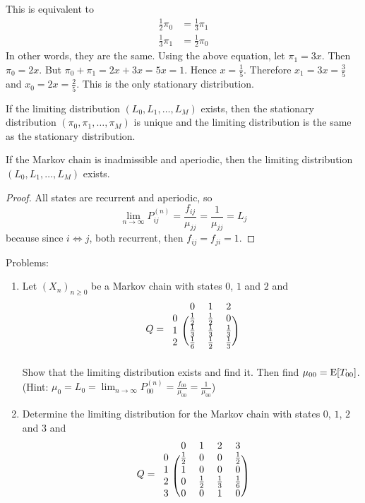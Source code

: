 \documentclass[12pt]{article}
\begin{document}
 This is equivalent to $$ \begin{aligned} \frac{1}{2}\pi_0 &= \frac{1}{3}\pi_1 \\ \frac{1}{3}\pi_1 &= \frac{1}{2}\pi_0 \end{aligned} $$ 
 In other words, they are the same. Using the above equation,  let $\pi_1 = 3x$. Then $\pi_0 = 2x$. But $\pi_0 + \pi_1 = 2x + 3x = 5x = 1$. Hence $x = \frac{1}{5}$. Therefore $x_1 = 3x = \frac{3}{5}$ and $x_0 = 2x = \frac{2}{5}$. This is the only stationary distribution. 
 \begin{theorem} If the limiting distribution $(L_0,L_1,\dots,L_M)$ exists, then the stationary distribution $(\pi_0,\pi_1,\dots,\pi_M)$ is unique and the limiting distribution is the same as the stationary distribution. \end{theorem} 
 \begin{theorem} If the Markov chain is inadmissible and aperiodic, then the limiting distribution $(L_0,L_1,\dots,L_M)$ exists. \end{theorem} 
 \begin{proof} All states are recurrent and aperiodic, so $$\lim_{n\to\infty} P_{ij}^{(n)} = \frac{f_{ij}}{\mu_{jj}} = \frac{1}{\mu_{jj}} = L_j $$
 because since $i \iff j$, both recurrent, then $f_{ij} = f_{ji} = 1$. \end{proof} 
 Problems: \begin{enumerate} 
 \item Let $(X_n)_{n\geq0}$ be a Markov chain with states $0$, $1$ and $2$ and $$ Q = \begin{blockarray}{cccc}
&0&1&2 \\
\begin{block}{c(ccc)}
0 & \frac{1}{2} & \frac{1}{2} & 0  \\
1 & \frac{1}{3} & \frac{1}{3} & \frac{1}{3}  \\ 
2 & \frac{1}{6} & \frac{1}{2} & \frac{1}{3}  \\  \end{block} \end{blockarray} $$
Show that the limiting distribution exists and find it. Then find $\mu_{00} = \mathrm{E}[ T_{00} ]$. (Hint: $\mu_0 = L_0 = \lim_{n\to\infty} P_{00}^{(n)} = \frac{f_{00}}{\mu_{00}} = \frac{1}{\mu_{00}}$)
\item Determine the limiting distribution for the Markov chain with states $0$, $1$, $2$ and $3$ and $$Q = \begin{blockarray}{ccccc}
&0&1&2&3 \\
\begin{block}{c(cccc)}
0 & \frac{1}{2} & 0 & 0 & \frac{1}{2}  \\
1 & 1 & 0 & 0 & 0 \\ 
2 & 0 & \frac{1}{2} & \frac{1}{3} & \frac{1}{6} \\ 
3 & 0 & 0 & 1 & 0 \\  \end{block} \end{blockarray} $$
\end{enumerate} 
\end{document}
